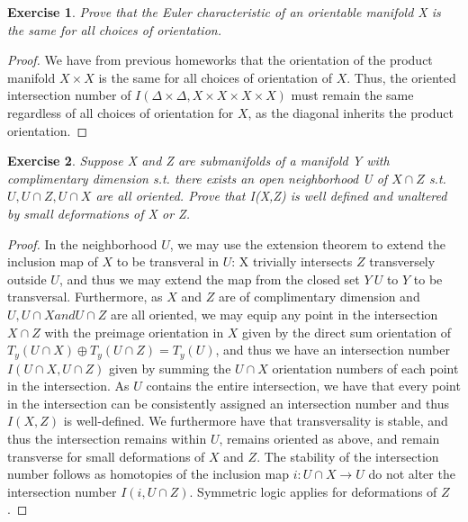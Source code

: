 \documentclass{article}
\newtheorem{exercise}{Exercise}
\begin{document}
\begin{exercise}
  Prove that the Euler characteristic of an orientable manifold X is the same for all choices of orientation.
\end{exercise}

\begin{proof}
  We have from previous homeworks that the orientation of the product manifold $X \times X$ is the same for all choices of orientation of $X$. Thus, the oriented intersection number of $I(\Delta \times \Delta, X \times X \times X \times X)$ must remain the same regardless of all choices of orientation for $X$, as the diagonal inherits the product orientation. 
\end{proof}

\begin{exercise}
  Suppose X and Z are submanifolds of a manifold Y with complimentary dimension s.t. there exists an open neighborhood U of $X \cap Z$ s.t. $U, U \cap Z, U \cap X$ are all oriented. Prove that I(X,Z) is well defined and unaltered by small deformations of X or Z.
\end{exercise}

\begin{proof}
  In the neighborhood $U$, we may use the extension theorem to extend the inclusion map of $X$ to be transveral in $U$: X trivially intersects $Z$ transversely outside $U$, and thus we may extend the map from the closed set $Y \ U$ to $Y$ to be transversal. Furthermore, as $X$ and $Z$ are of complimentary dimension and $U, U \cap X and U \cap Z$ are all oriented, we may equip any point in the intersection $X \cap Z$ with the preimage orientation in $X$ given by the direct sum orientation of $T_{y}(U \cap X) \oplus T_{y}(U \cap Z) = T_{y}(U)$, and thus we have an intersection number $I(U \cap X,U \cap Z)$ given by summing the $U \cap X$ orientation numbers of each point in the intersection. As $U$ contains the entire intersection, we have that every point in the intersection can be consistently assigned an intersection number and thus $I(X,Z)$ is well-defined. We furthermore have that transversality is stable, and thus the intersection remains within $U$, remains oriented as above, and remain transverse for small deformations of $X$ and $Z$. The stability of the intersection number follows as homotopies of the inclusion map $i: U \cap X \to U$ do not alter the intersection number $I(i, U \cap Z)$. Symmetric logic applies for deformations of $Z$.
\end{proof}
\end{document}

